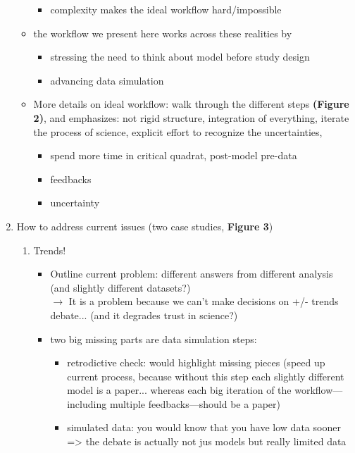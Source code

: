 \documentclass[11pt]{article}
\begin{document}
\begin{enumerate}
\begin{itemize}
\begin{itemize}
\item complexity makes the ideal workflow hard/impossible
\end{itemize}
\item the workflow we present here works across these realities by
\begin{itemize}
\item stressing the need to think about model before study design
\item advancing data simulation
\end{itemize}
\item More details on ideal workflow:  walk through the different steps \textbf{(Figure 2)}, and emphasizes: not rigid structure, integration of everything,  iterate the process of science, explicit effort to recognize the uncertainties, 
\begin{itemize}
\item spend more time in critical quadrat, post-model pre-data
\item feedbacks
\item uncertainty
\end{itemize}
\end{itemize}
\item How to address current issues (two case studies, \textbf{Figure 3})
\begin{enumerate}
\item Trends!
\begin{itemize}
\item Outline current problem: different answers from different analysis (and slightly different datasets?)\\
$\rightarrow$ It is a problem because we can't make decisions on +/- trends debate... (and it degrades trust in science?)
\item two big missing parts are data simulation steps:
\begin{itemize}
\item retrodictive check: would highlight missing pieces (speed up current process, because without this step each slightly different model is a paper... whereas each big iteration of the workflow---including multiple feedbacks---should be a paper)
\item simulated data: you would know that you have low data sooner => the debate is actually not jus models but really limited data
\end{itemize}
\end{itemize}

\end{enumerate}
\end{enumerate}
\end{document}

